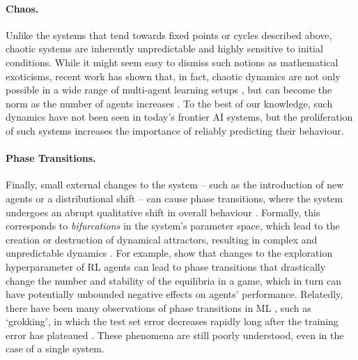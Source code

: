 \paragraph{Chaos.}
Unlike the systems that tend towards fixed points or cycles described above, chaotic systems are inherently unpredictable and highly sensitive to initial conditions. While it might seem easy to dismiss such notions as mathematical exoticisms, recent work has shown that, in fact, chaotic dynamics are not only possible in a wide range of multi-agent learning setups \citep{GallaFarmer2013,Andrade2021,VlatakisGkaragkounis2023,sato2002chaos,palaiopanos2017multiplicative}, but can become the norm as the number of agents increases \citep{Sanders2018,Cheung2020,Bielawski2021}.
To the best of our knowledge, such dynamics have not been seen in today's frontier AI systems, but the proliferation of such systems increases the importance of reliably predicting their behaviour.

\paragraph{Phase Transitions.}
Finally, small external changes to the system -- such as the introduction of new agents or a distributional shift -- can cause phase transitions, where the system undergoes an abrupt qualitative shift in overall behaviour \citep{BarfussEtAl2024}. Formally, this corresponds to \textit{bifurcations} in the system's parameter space, which lead to the creation or destruction of dynamical attractors, resulting in complex and unpredictable dynamics \citep{Crawford1991,Zeeman1976}.
For example, \citet{Leonardos2022} show that changes to the exploration hyperparameter of RL agents can lead to phase transitions that drastically change the number and stability of the equilibria in a game, which in turn can have potentially unbounded negative effects on agents' performance.
Relatedly, there have been many observations of phase transitions in ML \citep{Carroll2021,Olsson2022,Ziyin2022}, such as `grokking', in which the test set error decreases rapidly long after the training error has plateaued \citep{Power2022}.
These phenomena are still poorly understood, even in the case of a single system.

